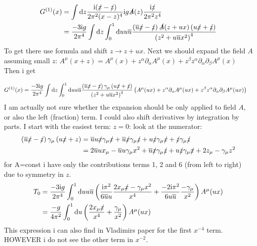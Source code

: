 \newcommand{\mainprogram}[0]{}




\begin{align}
	G^{(1)}(x) 
	&=  \int \text{d} z \frac{\text{i}(\slashed x - \slashed z)}{2\pi^2(x-z)^4} \text{i} g \slashed A (z) \frac{\text{i} \slashed z}{2\pi^2z^4}
	\\
	&= \frac{-3\text{i} g}{2\pi^4}\int \text{d} z \int_0^1 \text{d} u u \overline u \frac{\left(\overline u \slashed x - \slashed z\right) \slashed A(z+ux)\left(u \slashed x + \slashed z\right)}{\left(z^2+u\overline u x^2\right)^4} 
\end{align}
To get there use formula  and shift $z \rightarrow z+ux$. Next we should expand the field $A$ assuming small $z$: $ A^\mu(x+z) = A^\mu(x) + z^\alpha\partial_\alpha A^\mu(x) + z^\beta z^\alpha\partial_\alpha \partial_\beta A^\mu(x) $ 
Then i get

\begin{align}
G^{(1)}(x) 
&= 
\frac{-3\text{i} g}{2\pi^4}\int \text{d} z \int_0^1 \text{d} u u \overline u \frac{\left(\overline u \slashed x - \slashed z\right)\gamma_\mu\left(u \slashed x + \slashed z\right)}{\left(z^2+u\overline u x^2\right)^4} \left(A^\mu(ux) + z^\alpha\partial_\alpha A^\mu(ux) + z^\beta z^\alpha\partial_\alpha \partial_\beta A^\mu(ux) \right)
\end{align}
I am actually not sure whether the expansion should be only applied to field $A$, or also the left (fraction) term. I could also shift derivatives by integration by parts.
I start with the easiest term: $z=0$:
look at the numerator: 
\begin{align}
	\left(\overline u\slashed x - \slashed z\right)  \gamma_\mu \left( u \slashed x + z \right) 
	&=
	\overline u u \slashed x \gamma_\mu \slashed x + \overline u \slashed x \gamma_\mu \slashed z + u \slashed z \gamma_\mu \slashed x +\slashed z \gamma_\mu \slashed z
	\\	
	&=
	2\overline u u x_\mu - \overline u u\gamma_\mu x^2 + \overline u \slashed x \gamma_\mu \slashed z + u \slashed z \gamma_\mu \slashed x +2 z_\mu - \gamma_\mu z^2
\end{align}
for A=const i have only the contributions terms 1, 2 and 6 (from left to right) due to symmetry in $z$.
\begin{align}
	T_0 
	&=
	\frac{-3\text{i} g}{2\pi^4}\int_0^1\text{d} u u \overline u \left(\frac{\text{i}\pi^2}{6\overline u u } \frac{2 x_\mu \slashed x - \gamma_\mu x^2}{x^4} + \frac{-2\text{i}\pi^2}{6u\overline u }\frac{-\gamma_\mu}{x^2} \right)A^\mu(ux)
	\\
	&=
	\frac{-g}{4\pi^2}\int_0^1\text{d} u \left( \frac{2 x_\mu \slashed x }{x^4} + \frac{\gamma_\mu}{x^2} \right)A^\mu(ux)
\end{align}
This expression i can also find in Vladimirs paper for the first $x^{-4}$ term. HOWEVER i do not see the other term in $x^{-2}$.
